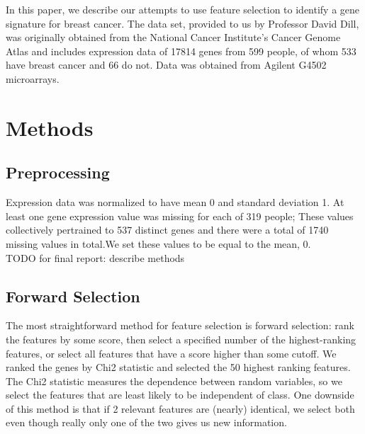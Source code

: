 \documentclass[11pt]{article}
\begin{document}
In this paper, we describe our attempts to use feature selection to identify a gene signature for breast cancer. The data set, provided to us by Professor David Dill, was originally obtained from the National Cancer Institute’s Cancer Genome Atlas and includes expression data of 17814 genes from 599 people, of whom 533 have breast cancer and 66 do not. Data was obtained from Agilent G4502 microarrays. 

\section{Methods}
\setcounter{subsection}{-1} %
\subsection{Preprocessing} 
Expression data was normalized to have mean 0 and standard deviation 1. At least one gene expression value was missing for each of 319 people; These values collectively pertrained to 537 distinct genes and there were a total of 1740 missing values in total.We set these values to be equal to the mean, 0. \\

TODO for final report: describe methods
\subsection{Forward Selection}
The most straightforward method for feature selection is forward selection: rank the features by some score, then select a specified number of the highest-ranking features, or select all features that have a score higher than some cutoff. We ranked the genes by Chi2 statistic and selected the 50 highest ranking features. The Chi2 statistic measures the dependence between random variables, so we select the features that are least likely to be independent of class. One downside of this method is that if 2 relevant features are (nearly) identical, we select both even though really only one of the two gives us new information.

\end{document}
